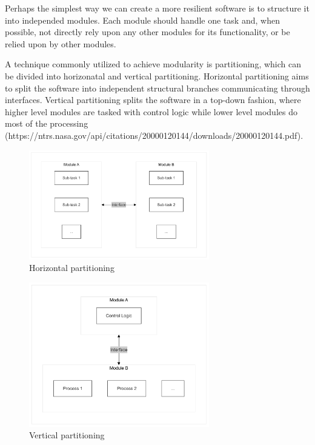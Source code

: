 \documentclass[12pt, letterpaper]{article}
\begin{document}
Perhaps the simplest way we can create a more resilient software is to structure it into independed modules. Each module should handle one task and, when possible, not directly rely upon any other modules for its functionality, or be relied upon by other modules.

A technique commonly utilized to achieve modularity is partitioning, which can be divided into horizonatal and vertical partitioning. Horizontal partitioning aims to split the software into independent structural branches communicating through interfaces. 
Vertical partitioning splits the software in a top-down fashion, where higher level modules are tasked with control logic while lower level modules do most of the processing (https://ntrs.nasa.gov/api/citations/20000120144/downloads/20000120144.pdf).

\begin{figure}[hbt!]
    \centering
    \includegraphics[width=0.7\textwidth]{modularity/horizontal.png}
    \caption{Horizontal partitioning}
    \label{fig:mod_hor}
\end{figure}

\begin{figure}[hbt!]
    \centering
    \includegraphics[width=0.7\textwidth]{modularity/vertical.png}
    \caption{Vertical partitioning}
    \label{fig:mod_ver}
\end{figure}
\end{document}
